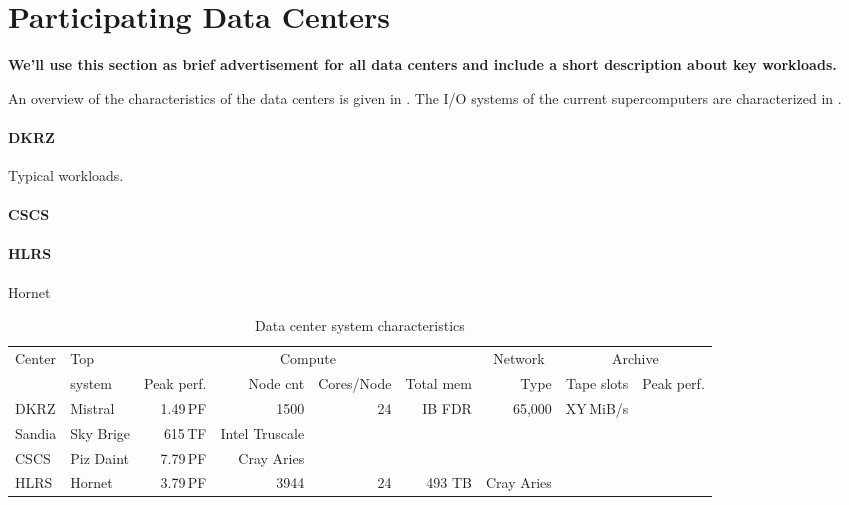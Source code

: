 \documentclass{superfri}
\numberwithin{equation}{section}
\begin{document}
\section{Participating Data Centers}
\label{sec:centers}

\textbf{We'll use this section as brief advertisement for all data centers and include a short description about key workloads.}

An overview of the characteristics of the data centers is given in .
The I/O systems of the current supercomputers are characterized in .


\paragraph{DKRZ}
Typical workloads.

\paragraph{CSCS}

\paragraph{HLRS}
Hornet



\begin{table}[bt]
\renewcommand{\arraystretch}{0.8}
\renewcommand{\tabcolsep}{0.1cm}
\begin{tabular}[c]{ll|r|r|r|r||r||r|r}
Center & Top    & \multicolumn{4}{c||}{Compute}      & \multicolumn{1}{c||}{Network}               & \multicolumn{2}{c}{Archive} \\
 & system & Peak perf. & Node cnt & Cores/Node & Total mem & Type                 & Tape slots & Peak perf. \\ \hline
 \hline

DKRZ & Mistral & 1.49\,PF   & 1500       & 24         & IB FDR                     & 65,000 & XY\,MiB/s \\ \hline
Sandia & Sky Brige & 615\,TF   & Intel Truscale \\ \hline
CSCS & Piz Daint & 7.79\,PF & Cray Aries \\ \hline
HLRS & Hornet & 3.79\,PF & 3944 & 24 & 493 TB & Cray Aries &   \\ \hline

\end{tabular}
\caption{Data center system characteristics\label{tbl:overviewCharacteristics}}
\end{table}
\end{document}
